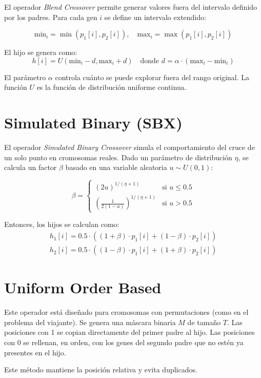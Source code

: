 El operador \textit{Blend Crossover} permite generar valores fuera del intervalo definido por los padres. Para cada gen $i$ se define un intervalo extendido:

\[
\text{min}_i = \min(p_1[i], p_2[i]), \quad
\text{max}_i = \max(p_1[i], p_2[i])
\]

El hijo se genera como:
\[
h[i] = U\left( \text{min}_i - d, \text{max}_i + d \right)
\quad \text{donde } d = \alpha \cdot (\text{max}_i - \text{min}_i)
\]

El parámetro $\alpha$ controla cuánto se puede explorar fuera del rango original. La función $U$ es la función de distribución uniforme continua.

\section{Simulated Binary (SBX)}

El operador \textit{Simulated Binary Crossover} simula el comportamiento del cruce de un solo punto en cromosomas reales. Dado un parámetro de distribución $\eta$, se calcula un factor $\beta$ basado en una variable aleatoria $u \sim U(0,1)$:

\[
\beta = \begin{cases}
	(2u)^{1/(\eta + 1)} & \text{si } u \leq 0.5 \\
	\left( \frac{1}{2(1 - u)} \right)^{1/(\eta + 1)} & \text{si } u > 0.5
\end{cases}
\]

Entonces, los hijos se calculan como:
\begin{gather*}
	h_1[i] = 0.5 \cdot \left( (1 + \beta) \cdot p_1[i] + (1 - \beta) \cdot p_2[i] \right) \\
	h_2[i] = 0.5 \cdot \left( (1 - \beta) \cdot p_1[i] + (1 + \beta) \cdot p_2[i] \right)
\end{gather*}

\section{Uniform Order Based}

Este operador está diseñado para cromosomas con permutaciones (como en el problema del viajante). Se genera una máscara binaria $M$ de tamaño $T$. Las posiciones con 1 se copian directamente del primer padre al hijo. Las posiciones con 0 se rellenan, en orden, con los genes del segundo padre que no estén ya presentes en el hijo.

Este método mantiene la posición relativa y evita duplicados.

